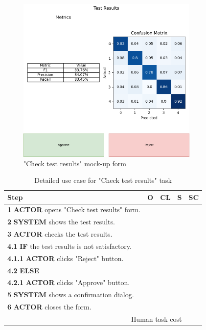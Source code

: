\begin{figure}[H]
\centering
\includegraphics[width=0.8\textwidth]{figures/check_test_results.png}
\caption{"Check test results" mock-up form}
\end{figure}

\begin{table}[H]
\centering
\begin{tabular}{|l|c|c|c|c|}
\hline
\textbf{Step} & \textbf{O} & \textbf{CL} & \textbf{S} & \textbf{SC} \\
\hline
\textbf{1} \textbf{ACTOR} opens "Check test results" form. & & & & \\
\hline
\textbf{2} \textbf{SYSTEM} shows the test results. & & & & \\
\hline
\textbf{3} \textbf{ACTOR} checks the test results. & & & & \\
\hline
\textbf{4.1} \textbf{IF} the test results is not satisfactory. & & & & \\
\hline
\textbf{4.1.1} \textbf{ACTOR} clicks "Reject" button. & & & & \\
\hline
\textbf{4.2} \textbf{ELSE} & & & & \\
\hline
\textbf{4.2.1} \textbf{ACTOR} clicks "Approve" button. & & & & \\
\hline
\textbf{5} \textbf{SYSTEM} shows a confirmation dialog. & & & & \\
\hline
\textbf{6} \textbf{ACTOR} closes the form. & & & & \\
\hline
\multicolumn{4}{|r|}{Human task cost} & \\
\hline
\end{tabular}
\caption{Detailed use case for "Check test results" task}
\label{table:check_test_results}
\end{table}



